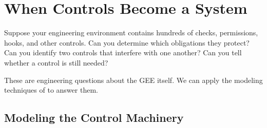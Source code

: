 


\chapter{When Controls Become a System}



Suppose your engineering environment contains hundreds of checks, permissions, hooks, and other controls. Can you determine which obligations they protect? Can you identify two controls that interfere with one another? Can you tell whether a control is still needed?

These are engineering questions about the GEE itself. We can apply the modeling techniques of  to answer them.



\section{Modeling the Control Machinery}\label{heading:model-interactions-between-controls}

